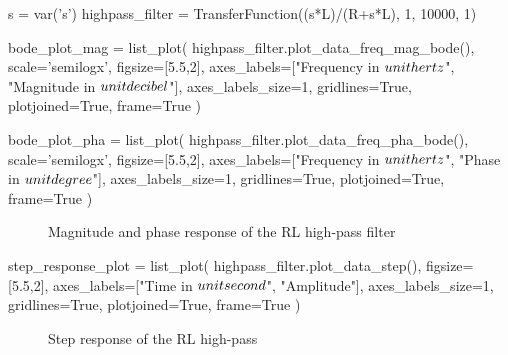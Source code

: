 \begin{sagesilent}
    s = var('s')
    highpass_filter = TransferFunction((s*L)/(R+s*L), 1, 10000, 1)

    bode_plot_mag = list_plot(
        highpass_filter.plot_data_freq_mag_bode(),
        scale='semilogx',
        figsize=[5.5,2],
        axes_labels=["Frequency in $\\unit{\\hertz}$", "Magnitude in $\\unit{\\decibel}$"],
        axes_labels_size=1,
        gridlines=True,
        plotjoined=True,
        frame=True
    )

    bode_plot_pha = list_plot(
        highpass_filter.plot_data_freq_pha_bode(),
        scale='semilogx',
        figsize=[5.5,2],
        axes_labels=["Frequency in $\\unit{\\hertz}$", "Phase in $\\unit{\\degree}$"],
        axes_labels_size=1,
        gridlines=True,
        plotjoined=True,
        frame=True
    )
\end{sagesilent}

\begin{figure}[H]
    \centering
    \begin{subfigure}{\textwidth}
        \centering
    \end{subfigure}
    \quad
    \begin{subfigure}{\textwidth}
        \centering
    \end{subfigure}
    \caption{Magnitude and phase response of the RL high-pass filter}
\end{figure}

\begin{sagesilent}
    step_response_plot = list_plot(
        highpass_filter.plot_data_step(),
        figsize=[5.5,2],
        axes_labels=["Time in $\\unit{\\second}$", "Amplitude"],
        axes_labels_size=1,
        gridlines=True,
        plotjoined=True,
        frame=True
    )
\end{sagesilent}

\begin{figure}[H]
    \centering
    \caption{Step response of the RL high-pass}
\end{figure}

